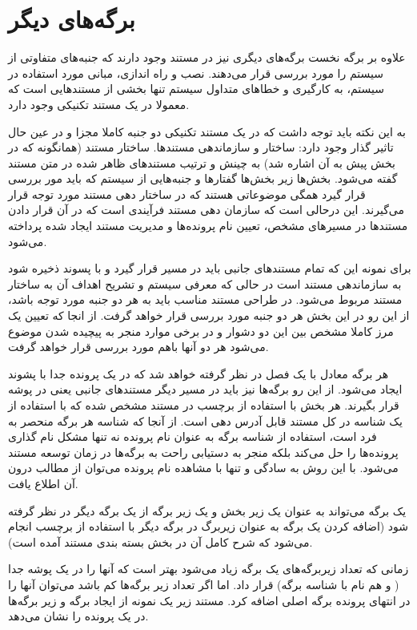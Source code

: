 
\section{برگه‌های دیگر}
  علاوه بر برگه نخست برگه‌های دیگری نیز در مستند وجود دارند که جنبه‌های متفاوتی
  از سیستم را مورد بررسی قرار می‌دهند. نصب و راه اندازی، مبانی مورد استفاده در
  سیستم، به کارگیری و خطاهای متداول سیستم تنها بخشی از مستندهایی است که معمولا
  در یک مستند تکنیکی وجود دارد.

  به این نکته باید توجه داشت که در یک مستند تکنیکی دو جنبه کاملا مجزا و در عین حال
  تاثیر گذار وجود دارد: ساختار و سازماندهی مستندها. ساختار
  مستند (همانگونه که در بخش پیش به آن اشاره شد) به چینش و ترتیب مستندهای ظاهر
  شده در متن مستند گفته می‌شود. بخش‌ها زیر بخش‌ها گفتارها و جنبه‌هایی از سیستم که باید 
  مور بررسی قرار گیرد همگی موضوعاتی هستند که در ساختار دهی مستند مورد توجه قرار می‌گیرند.
 این درحالی است که سازمان
  دهی مستند فرآیندی است که در آن قرار دادن مستندها در مسیرهای مشخص، تعیین نام پرونده‌ها و مدیریت
  مستند ایجاد شده پرداخته می‌شود.

  برای نمونه این که تمام مستندهای جانبی باید در مسیر  قرار گیرد و با پسوند
   ذخیره شود به سازماندهی مستند است در حالی که معرفی سیستم و
  تشریح اهداف آن به ساختار مستند مربوط می‌شود.
  در طراحی مستند مناسب باید به هر دو جنبه مورد توجه باشد، از این رو در این بخش هر دو
  جنبه مورد بررسی قرار خواهد گرفت. از انجا که تعیین یک مرز کاملا مشخص بین این
  دو دشوار و در برخی موارد منجر به پیچیده شدن موضوع می‌شود هر دو آنها باهم مورد بررسی قرار خواهد گرفت.

  هر برگه معادل با یک فصل در نظر گرفته خواهد شد که در یک پرونده جدا با پشوند
   ایجاد می‌شود. از این رو برگه‌ها نیز باید در مسیر دیگر مستندهای
  جانبی یعنی در پوشه  قرار بگیرند.
  هر بخش با استفاده از برچسب  در مستند مشخص شده که با استفاده از یک
  شناسه در کل مستند قابل آدرس دهی است.
  از آنجا که شناسه هر برگه منحصر به فرد است، استفاده از شناسه برگه به عنوان نام
  پرونده نه تنها مشکل نام گذاری پرونده‌ها را حل می‌کند بلکه منجر به دستیابی راحت
  به برگه‌ها در زمان توسعه مستند می‌شود. با این روش به سادگی و تنها با مشاهده
  نام پرونده می‌توان از مطالب درون آن اطلاع یافت.

  یک برگه می‌تواند به عنوان یک زیر بخش و یک زیر برگه از یک برگه دیگر در نظر
  گرفته شود (اضافه کردن یک برگه به عنوان زیربرگ در برگه دیگر با استفاده از برچسب
   انجام می‌شود که شرح کامل آن در بخش بسته بندی مستند آمده است).

  زمانی که تعداد زیربرگه‌های یک برگه زیاد می‌شود بهتر است که آنها را در یک پوشه
  جدا ( و هم نام با شناسه برگه) قرار داد. اما اگر تعداد زیر برگه‌ها کم باشد
  می‌توان آنها را در انتهای پرونده برگه اصلی اضافه کرد. مستند زیر یک نمونه از
  ایجاد برگه و زیر برگه‌ها در یک پرونده را نشان می‌دهد.

